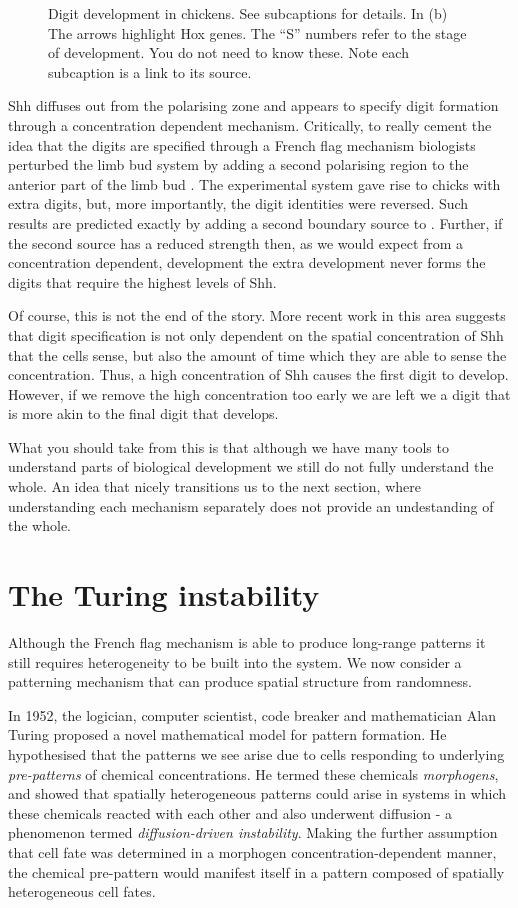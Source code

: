 \begin{figure}[!!!h!!!tbp]
\caption{Digit development in chickens. See subcaptions for details. In (b) The arrows highlight Hox genes. The ``S'' numbers refer to the stage of development. You do not need to know these. Note each subcaption is a link to its source.\label{Limb_bud}}
\end{figure}

Shh diffuses out from the polarising zone and appears to specify digit formation through a concentration dependent mechanism. Critically, to really cement the idea that the digits are specified through a French flag mechanism biologists perturbed the limb bud system by adding a second polarising region to the anterior part of the limb bud . The experimental system gave rise to chicks with extra digits, but, more importantly, the digit identities were reversed. Such results are predicted exactly by adding a second boundary source to . Further, if the second source has a reduced strength then, as we would expect from a concentration dependent, development the extra development never forms the digits that require the highest levels of Shh.

Of course, this is not the end of the story. More recent work in this area suggests that digit specification is not only dependent on the spatial concentration of Shh that the cells sense, but also the amount of time which they are able to sense the concentration. Thus, a high concentration of Shh causes the first digit to develop. However, if we remove the high concentration too early we are left we a digit that is more akin to the final digit that develops.

What you should take from this is that although we have many tools to understand parts of biological development we still do not fully understand the whole. An idea that nicely transitions us to the next section, where understanding each mechanism separately does not provide an undestanding of the whole.

\section{The Turing instability}
Although the French flag mechanism is able to produce long-range patterns it still requires heterogeneity to be built into the system.  We now consider a patterning mechanism that can produce spatial structure from randomness.

In 1952, the logician, computer scientist, code breaker and mathematician Alan Turing proposed a novel mathematical model for pattern formation. He hypothesised that the patterns we see arise due to cells responding to underlying {\it pre-patterns} of chemical concentrations. He termed these chemicals {\it morphogens}, and showed that spatially heterogeneous patterns could arise in systems in which these chemicals reacted with each other and also underwent diffusion - a phenomenon termed {\it diffusion-driven instability}. Making the further assumption that cell fate was determined in a morphogen concentration-dependent manner, the chemical pre-pattern would manifest itself in a pattern composed of spatially heterogeneous cell fates. 

